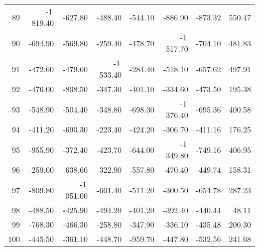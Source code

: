 \begin{longtable}{rrrrrrrr}
89 & -1\,819.40 & -627.80 & -488.40 & -544.10 & -886.90 & -873.32 & 550.47  \\
90 & -694.90 & -569.80 & -259.40 & -478.70 & -1\,517.70 & -704.10 & 481.83  \\
91 & -472.60 & -479.60 & -1\,533.40 & -284.40 & -518.10 & -657.62 & 497.91  \\
92 & -476.00 & -808.50 & -347.30 & -401.10 & -334.60 & -473.50 & 195.38  \\
93 & -548.90 & -504.40 & -348.80 & -698.30 & -1\,376.40 & -695.36 & 400.58  \\
94 & -411.20 & -690.30 & -223.40 & -424.20 & -306.70 & -411.16 & 176.25  \\
95 & -955.90 & -372.40 & -423.70 & -644.00 & -1\,349.80 & -749.16 & 406.95  \\
96 & -259.00 & -638.60 & -322.90 & -557.80 & -470.40 & -449.74 & 158.31  \\
97 & -809.80 & -1\,051.00 & -601.40 & -511.20 & -300.50 & -654.78 & 287.23  \\
98 & -488.50 & -425.90 & -494.20 & -401.20 & -392.40 & -440.44 & 48.11  \\
99 & -768.30 & -466.30 & -258.80 & -347.90 & -336.10 & -435.48 & 200.30  \\
100 & -445.50 & -361.10 & -448.70 & -959.70 & -447.80 & -532.56 & 241.68  \\

\end{longtable}


